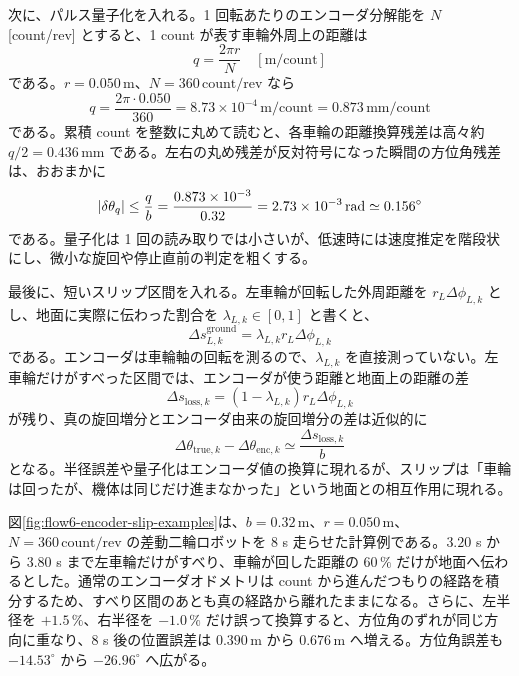 次に、パルス量子化を入れる。1 回転あたりのエンコーダ分解能を $N$ [count/rev] とすると、1 count が表す車輪外周上の距離は
\begin{equation}
  q=\frac{2\pi r}{N}\quad[\mathrm{m/count}]
\end{equation}
である。$r=0.050\,\mathrm{m}$、$N=360\,\mathrm{count/rev}$ なら
\begin{equation}
  q
  =
  \frac{2\pi\cdot0.050}{360}
  =
  8.73\times10^{-4}\,\mathrm{m/count}
  =
  0.873\,\mathrm{mm/count}
\end{equation}
である。累積 count を整数に丸めて読むと、各車輪の距離換算残差は高々約 $q/2=0.436\,\mathrm{mm}$ である。左右の丸め残差が反対符号になった瞬間の方位角残差は、おおまかに
\begin{equation}
  \left|\delta\theta_q\right|
  \le
  \frac{q}{b}
  =
  \frac{0.873\times10^{-3}}{0.32}
  =
  2.73\times10^{-3}\,\mathrm{rad}
  \simeq0.156^\circ
\end{equation}
である。量子化は 1 回の読み取りでは小さいが、低速時には速度推定を階段状にし、微小な旋回や停止直前の判定を粗くする。

最後に、短いスリップ区間を入れる。左車輪が回転した外周距離を $r_L\Delta\phi_{L,k}$ とし、地面に実際に伝わった割合を $\lambda_{L,k}\in[0,1]$ と書くと、
\begin{equation}
  \Delta s^{\mathrm{ground}}_{L,k}
  =
  \lambda_{L,k}r_L\Delta\phi_{L,k}
\end{equation}
である。エンコーダは車輪軸の回転を測るので、$\lambda_{L,k}$ を直接測っていない。左車輪だけがすべった区間では、エンコーダが使う距離と地面上の距離の差
\begin{equation}
  \Delta s_{\mathrm{loss},k}
  =
  (1-\lambda_{L,k})r_L\Delta\phi_{L,k}
\end{equation}
が残り、真の旋回増分とエンコーダ由来の旋回増分の差は近似的に
\begin{equation}
  \Delta\theta_{\mathrm{true},k}
  -
  \Delta\theta_{\mathrm{enc},k}
  \simeq
  \frac{\Delta s_{\mathrm{loss},k}}{b}
\end{equation}
となる。半径誤差や量子化はエンコーダ値の換算に現れるが、スリップは「車輪は回ったが、機体は同じだけ進まなかった」という地面との相互作用に現れる。

図\ref{fig:flow6-encoder-slip-examples}は、$b=0.32\,\mathrm{m}$、$r=0.050\,\mathrm{m}$、$N=360\,\mathrm{count/rev}$ の差動二輪ロボットを 8 s 走らせた計算例である。$3.20$ s から $3.80$ s まで左車輪だけがすべり、車輪が回した距離の $60\,\%$ だけが地面へ伝わるとした。通常のエンコーダオドメトリは count から進んだつもりの経路を積分するため、すべり区間のあとも真の経路から離れたままになる。さらに、左半径を $+1.5\,\%$、右半径を $-1.0\,\%$ だけ誤って換算すると、方位角のずれが同じ方向に重なり、8 s 後の位置誤差は $0.390\,\mathrm{m}$ から $0.676\,\mathrm{m}$ へ増える。方位角誤差も $-14.53^\circ$ から $-26.96^\circ$ へ広がる。

